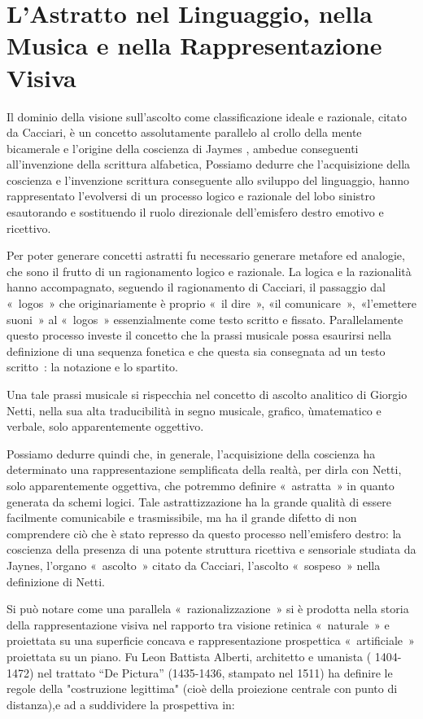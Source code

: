 \section{L’Astratto nel Linguaggio, nella Musica e nella Rappresentazione Visiva}

Il dominio della visione sull’ascolto come classificazione ideale e razionale,
citato da Cacciari, è un concetto assolutamente parallelo  al crollo della mente
bicamerale e l’origine della coscienza  di Jaymes , ambedue conseguenti
all’invenzione della scrittura alfabetica, Possiamo dedurre che l’acquisizione
della coscienza e  l’invenzione  scrittura conseguente allo sviluppo del
linguaggio, hanno  rappresentato l’evolversi   di un processo logico e razionale
del lobo sinistro esautorando e sostituendo  il ruolo direzionale dell’emisfero
destro emotivo e ricettivo.

Per poter generare concetti astratti fu necessario  generare metafore ed
analogie, che sono il frutto di un ragionamento logico e razionale. La logica e
la razionalità hanno accompagnato, seguendo il ragionamento di Cacciari, il
passaggio dal « logos » che originariamente è proprio « il dire »,
«il comunicare », «l’emettere suoni » al « logos » essenzialmente come testo
scritto e fissato. Parallelamente questo processo investe il concetto che la
prassi musicale  possa esaurirsi nella definizione di una sequenza fonetica e
che questa sia consegnata ad un testo scritto : la notazione e lo spartito.

Una tale prassi musicale  si rispecchia nel concetto di ascolto analitico di
Giorgio Netti, nella sua alta traducibilità in segno musicale, grafico,
ùmatematico e verbale, solo apparentemente oggettivo.

Possiamo dedurre quindi che, in generale,  l’acquisizione della coscienza ha
determinato una rappresentazione semplificata della realtà, per dirla con Netti,
solo apparentemente oggettiva, che potremmo definire « astratta » in quanto
generata da schemi logici. Tale astrattizzazione  ha la grande qualità di essere
facilmente comunicabile e trasmissibile,  ma ha il grande difetto di non
comprendere ciò che è stato represso  da questo processo nell’emisfero  destro:
la coscienza della presenza   di una potente struttura ricettiva e  sensoriale
studiata da Jaynes, l’organo « ascolto » citato da  Cacciari, l’ascolto « sospeso »
nella definizione di Netti.

Si può notare come una parallela « razionalizzazione »  si è prodotta nella
storia della rappresentazione visiva  nel rapporto tra visione retinica
« naturale » e proiettata su una superficie concava e rappresentazione
prospettica « artificiale » proiettata su un piano. Fu Leon Battista Alberti,
architetto e umanista ( 1404-1472) nel trattato “De Pictura” (1435-1436,
stampato nel 1511) ha definire  le regole della "costruzione legittima"
(cioè della proiezione centrale con punto di distanza),e ad a suddividere la
prospettiva in:

